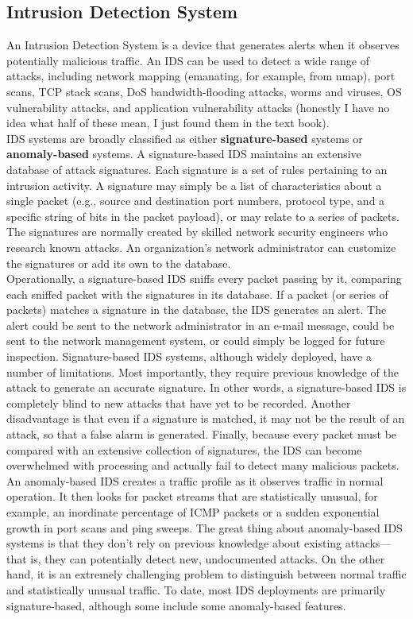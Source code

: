 \documentclass{article}
\begin{document}
\subsection*{Intrusion Detection System}
An Intrusion Detection System is a device that generates alerts when it observes potentially malicious traffic. An IDS can be used to detect a wide range of attacks, including network mapping (emanating, for example, from nmap), port scans, TCP stack scans, DoS bandwidth-flooding attacks, worms and viruses, OS vulnerability attacks, and application vulnerability attacks (honestly I have no idea what half of these mean, I just found them in the text book).\\[1\baselineskip]
IDS systems are broadly classified as either {\bf signature-based} systems or
{\bf anomaly-based} systems. A signature-based IDS maintains an extensive database
of attack signatures. Each signature is a set of rules pertaining to an intrusion activity.
A signature may simply be a list of characteristics about a single packet (e.g.,
source and destination port numbers, protocol type, and a specific string of bits in
the packet payload), or may relate to a series of packets. The signatures are normally
created by skilled network security engineers who research known attacks.
An organization’s network administrator can customize the signatures or add its
own to the database.\\[1\baselineskip]
Operationally, a signature-based IDS sniffs every packet passing by it, comparing
each sniffed packet with the signatures in its database. If a packet (or series of
packets) matches a signature in the database, the IDS generates an alert. The alert
could be sent to the network administrator in an e-mail message, could be sent to the
network management system, or could simply be logged for future inspection.
Signature-based IDS systems, although widely deployed, have a number of limitations.
Most importantly, they require previous knowledge of the attack to generate
an accurate signature. In other words, a signature-based IDS is completely blind to
new attacks that have yet to be recorded. Another disadvantage is that even if a signature
is matched, it may not be the result of an attack, so that a false alarm is generated.
Finally, because every packet must be compared with an extensive collection of
signatures, the IDS can become overwhelmed with processing and actually fail to
detect many malicious packets.\\[1\baselineskip]
An anomaly-based IDS creates a traffic profile as it observes traffic in normal
operation. It then looks for packet streams that are statistically unusual, for example,
an inordinate percentage of ICMP packets or a sudden exponential growth in
port scans and ping sweeps. The great thing about anomaly-based IDS systems is
that they don’t rely on previous knowledge about existing attacks—that is, they can
potentially detect new, undocumented attacks. On the other hand, it is an extremely
challenging problem to distinguish between normal traffic and statistically unusual
traffic. To date, most IDS deployments are primarily signature-based, although
some include some anomaly-based features.
\end{document}
